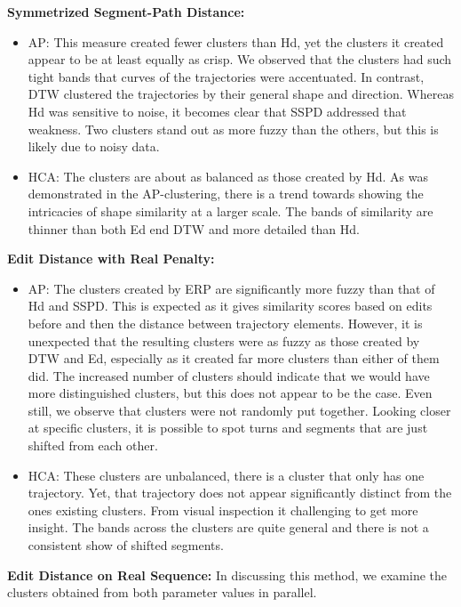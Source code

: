 \textbf{Symmetrized Segment-Path Distance:}
\begin{itemize}

\item AP: This measure created fewer clusters than Hd, yet the clusters it created appear to be at least equally as crisp.
We observed that the clusters had such tight bands that curves of the trajectories were accentuated.
In contrast, DTW clustered the trajectories by their general shape and direction.
Whereas Hd was sensitive to noise, it becomes clear that SSPD addressed that weakness.
Two clusters stand out as more fuzzy than the others, but this is likely due to noisy data.
\medskip 
\item HCA: The clusters are about as balanced as those created by Hd. 
As was demonstrated in the AP-clustering, there is a trend towards showing the intricacies of shape similarity at a larger scale. 
The bands of similarity are thinner than both Ed end DTW and more detailed than Hd. 
\end{itemize}


\textbf{Edit Distance with Real Penalty:}
\begin{itemize}

\item AP:  The clusters created by ERP are significantly more fuzzy than that of Hd and SSPD. 
This is expected as it gives similarity scores based on edits before and then the distance between trajectory elements.
However, it is unexpected that the resulting clusters were as fuzzy as those created by DTW and Ed, especially as it created far more clusters than either of them did.
The increased number of clusters should indicate that we would have more distinguished clusters, but this does not appear to be the case.
Even still, we observe that clusters were not randomly put together.
Looking closer at specific clusters, it is possible to spot turns and segments that are just shifted from each other. 
\medskip
\item HCA: These clusters are unbalanced, there is a cluster that only has one trajectory. 
Yet, that trajectory does not appear significantly distinct from the ones existing clusters. 
From visual inspection it challenging to get more insight. 
The bands across the clusters are quite general and there is not a consistent show of shifted segments.

\end{itemize}

\textbf{Edit Distance on Real Sequence: }
In discussing this method, we examine the clusters obtained from both parameter values in parallel.  


